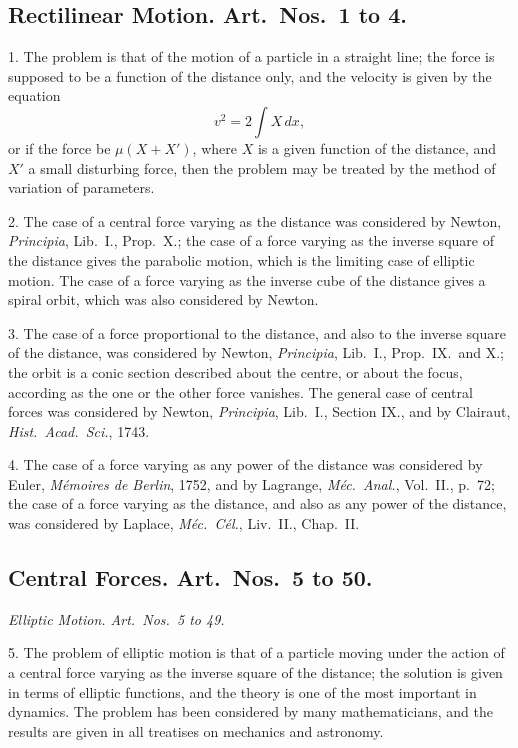 \documentclass[11pt,a4paper]{article}
\begin{document}
\subsection*{Rectilinear Motion. Art.\ Nos.\ 1 to 4.}

1. The problem is that of the motion of a particle in a straight line; the force is supposed to be a function of the distance only, and the velocity is given by the equation
\[
v^2 = 2\int X\,dx,
\]
or if the force be $\mu(X + X')$, where $X$ is a given function of the distance, and $X'$ a small disturbing force, then the problem may be treated by the method of variation of parameters.

\newpage
\setcounter{page}{515}

2. The case of a central force varying as the distance was considered by Newton, \textit{Principia}, Lib.\ I., Prop.\ X.; the case of a force varying as the inverse square of the distance gives the parabolic motion, which is the limiting case of elliptic motion. The case of a force varying as the inverse cube of the distance gives a spiral orbit, which was also considered by Newton.

3. The case of a force proportional to the distance, and also to the inverse square of the distance, was considered by Newton, \textit{Principia}, Lib.\ I., Prop.\ IX.\ and X.; the orbit is a conic section described about the centre, or about the focus, according as the one or the other force vanishes. The general case of central forces was considered by Newton, \textit{Principia}, Lib.\ I., Section IX., and by Clairaut, \textit{Hist.\ Acad.\ Sci.}, 1743.

4. The case of a force varying as any power of the distance was considered by Euler, \textit{M\'emoires de Berlin}, 1752, and by Lagrange, \textit{M\'ec.\ Anal.}, Vol.\ II., p.~72; the case of a force varying as the distance, and also as any power of the distance, was considered by Laplace, \textit{M\'ec.\ C\'el.}, Liv.\ II., Chap.\ II.

\subsection*{Central Forces. Art.\ Nos.\ 5 to 50.}

\textit{Elliptic Motion. Art.\ Nos.\ 5 to 49.}

5. The problem of elliptic motion is that of a particle moving under the action of a central force varying as the inverse square of the distance; the solution is given in terms of elliptic functions, and the theory is one of the most important in dynamics. The problem has been considered by many mathematicians, and the results are given in all treatises on mechanics and astronomy.
\end{document}
